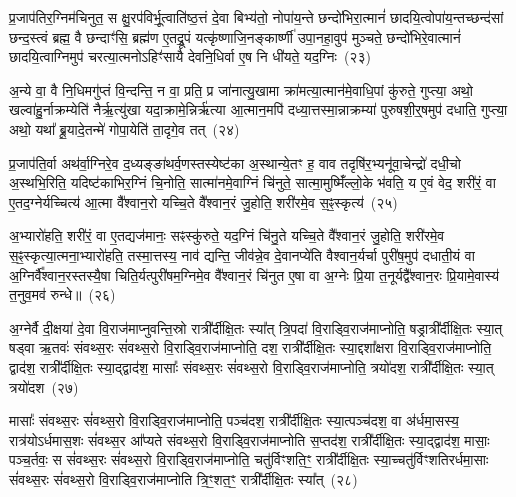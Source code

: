 प्र॒जा\-प॑तिर॒ग्निम॑चिनुत॒ स क्षु॒रप॑विर्भू॒त्वाति॑ष्ठ॒त्तं दे॒वा बिभ्य॑तो॒ नोपा॑य॒न्ते छन्दो॑भिरा॒त्मानं॑ छादयि॒त्वोपा॑य॒न्तच्छन्द॑सां छन्द॒स्त्वं ब्रह्म॒ वै छन्दाꣳ॑सि॒ ब्रह्म॑ण ए॒तद्रू॒पं यत्कृ॑ष्णाजि॒नङ्कार्ष्णी॑ उपा॒नहा॒वुप॑ मुञ्चते॒ छन्दो॑भिरे॒वात्मानं॑ छादयि॒त्वाग्निमुप॑ चरत्या॒त्मनो\-ऽहिꣳ॑सायै देवनि॒धिर्वा ए॒ष नि धी॑यते॒ यद॒ग्निः~(२३)

अ॒न्ये वा॒ वै नि॒धिमगु॑प्तं वि॒न्दन्ति॒ न वा॒ प्रति॒ प्र जा॑नात्यु॒खामा क्रा॑मत्या॒त्मान॑मे॒वाधि॒पां कु॑रुते॒ गुप्त्या॒ अथो॒ खल्वा॑हु॒र्नाक्रम्येति॑ नैर्\mbox{}ऋ॒त्यु॑खा यदा॒क्रामे॒न्निर्\mbox{}ऋ॑त्या आ॒त्मान॒मपि॑ दध्या॒त्तस्मा॒न्नाक्रम्या॑ पुरुषशी॒र्॒\mbox{}षमुप॑ दधाति॒ गुप्त्या॒ अथो॒ यथा᳚ ब्रू॒यादे॒तन्मे॑ गोपा॒येति॑ ता॒दृगे॒व तत्~(२४)

प्र॒जा\-प॑ति॒र्वा अथ॑र्वा॒ग्निरे॒व द॒ध्यङ्ङा॑थर्व॒णस्तस्येष्ट॑का अ॒स्थान्ये॒तꣳ ह॒ वाव तदृषि॑र॒भ्यनू॑वा॒चेन्द्रो॑ दधी॒चो अ॒स्थभि॒रिति॒ यदिष्ट॑काभिर॒ग्निं चि॒नोति॒ सात्मा॑नमे॒वाग्निं चि॑नुते॒ सात्मा॒मुष्मिँ॑ल्लो॒के भ॑वति॒ य ए॒वं वेद॒ शरी॑रं॒ वा ए॒तद॒ग्नेर्यच्चित्य॑ आ॒त्मा वै᳚श्वान॒रो यच्चि॒ते वै᳚श्वान॒रं जु॒होति॒ शरी॑रमे॒व स॒ꣴ॒स्कृत्य॑~(२५)

अ॒भ्यारो॑हति॒ शरी॑रं॒ वा ए॒तद्यज॑मानः॒ सꣴस्कु॑रुते॒ यद॒ग्निं चि॑नु॒ते यच्चि॒ते वै᳚श्वान॒रं जु॒होति॒ शरी॑रमे॒व स॒ꣴ॒स्कृत्या॒त्मना॒भ्यारो॑हति॒ तस्मा॒त्तस्य॒ नाव॑ द्यन्ति॒ जीव॑न्ने॒व दे॒वानप्ये॑ति वैश्वान॒र्यर्चा पुरी॑ष॒मुप॑ दधाती॒यं वा अ॒ग्निर्वै᳚श्वान॒रस्तस्यै॒षा चिति॒र्यत्पुरी॑षम॒ग्निमे॒व वै᳚श्वान॒रं चि॑नुत ए॒षा वा अ॒ग्नेः प्रि॒या त॒नूर्यद्वै᳚श्वान॒रः प्रि॒यामे॒वास्य॑ त॒नुव॒मव॑ रुन्धे॥~(२६)

{\anuvakamend[{अ॒ग्निस्तथ्स॒ꣴ॒स्कृत्या॒ग्नेर्दश॑ च}]}%

अ॒ग्नेर्वै दी॒क्षया॑ दे॒वा वि॒राज॑माप्नुवन्ति॒स्रो रात्री᳚र्दीक्षि॒तः स्या᳚त् त्रि॒पदा॑ वि॒राड्वि॒राज॑माप्नोति॒ षड्रात्री᳚र्दीक्षि॒तः स्या॒त् षड्वा ऋ॒तवः॑ संवथ्स॒रः सं॑वथ्स॒रो वि॒राड्वि॒राज॑माप्नोति॒ दश॒ रात्री᳚र्दीक्षि॒तः स्या॒द्दशा᳚क्षरा वि॒राड्वि॒राज॑माप्नोति॒ द्वाद॑श॒ रात्री᳚र्दीक्षि॒तः स्या॒द्द्वाद॑श॒ मासाः᳚ संवथ्स॒रः सं॑वथ्स॒रो वि॒राड्वि॒राज॑माप्नोति॒ त्रयो॑दश॒ रात्री᳚र्दीक्षि॒तः स्या॒त् त्रयो॑दश~(२७)

मासाः᳚ संवथ्स॒रः सं॑वथ्स॒रो वि॒राड्वि॒राज॑माप्नोति॒ पञ्च॑दश॒ रात्री᳚र्दीक्षि॒तः स्या॒त्पञ्च॑दश॒ वा अ॑र्धमा॒सस्य॒ रात्र॑यो\-ऽर्धमास॒शः सं॑वथ्स॒र आ᳚प्यते संवथ्स॒रो वि॒राड्वि॒राज॑माप्नोति स॒प्तद॑श॒ रात्री᳚र्दीक्षि॒तः स्या॒द्द्वाद॑श॒ मासाः॒ पञ्च॒र्तवः॒ स सं॑वथ्स॒रः सं॑वथ्स॒रो वि॒राड्वि॒राज॑माप्नोति॒ चतु॑र्विꣳशति॒ꣳ॒ रात्री᳚र्दीक्षि॒तः स्या॒च्चतु॑र्विꣳशतिरर्धमा॒साः सं॑वथ्स॒रः सं॑वथ्स॒रो वि॒राड्वि॒राज॑माप्नोति त्रि॒ꣳ॒शत॒ꣳ॒ रात्री᳚र्दीक्षि॒तः स्या᳚त्~(२८)

